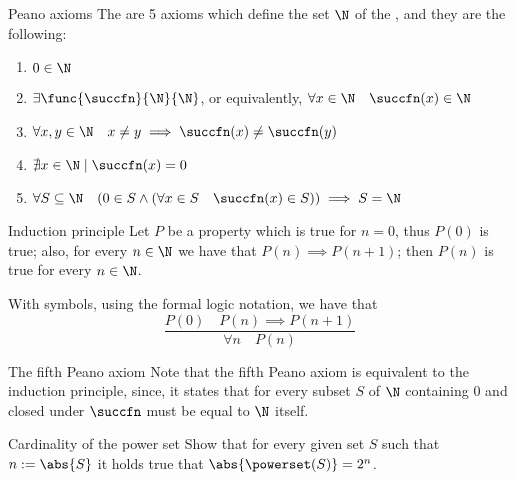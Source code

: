 \documentclass[a4paper, 12pt]{report}
\begin{document}
    \begin{frameddefn}{Peano axioms}
        The  are 5 axioms which define the set $\N$ of the , and they are the following:

        \begin{enumerate}[label=\roman*), font=\itshape]
            \item $0 \in \N$
            \item $\exists \func{\succfn}{\N}{\N}$, or equivalently, $\forall x \in \N \quad \succfn(x) \in \N$
            \item $\forall x, y \in \N \quad x \neq y \implies \succfn(x) \neq \succfn(y)$
            \item $\nexists x \in \N \mid \succfn(x) = 0$
            \item $\forall S \subseteq \N \quad (0 \in S \land (\forall x \in S \quad \succfn(x) \in S)) \implies S = \N$
        \end{enumerate}
    \end{frameddefn}

    \begin{framedprinc}{Induction principle}
        Let $P$ be a property which is true for $n = 0$, thus $P(0)$ is true; also, for every $n \in \N$ we have that $P(n) \implies P(n + 1)$; then $P(n)$ is true for every $n \in \N$.

        With symbols, using the formal logic notation, we have that $$\dfrac{P(0) \quad P(n) \implies P(n + 1)}{ \forall n \quad P(n )}$$
    \end{framedprinc}

    \begin{framedobs}{The fifth Peano axiom}
        Note that the fifth Peano axiom is equivalent to the induction principle, since, it states that for every subset $S$ of $\N$ containing 0 and closed under $\succfn$ must be equal to $\N$ itself.
    \end{framedobs}

    \begin{framedprob}{Cardinality of the power set}
    Show that for every given set $S$ such that $n := \abs{S}$ it holds true that $\abs{\powerset(S)} = 2^n$.
    \end{framedprob}

\end{document}
